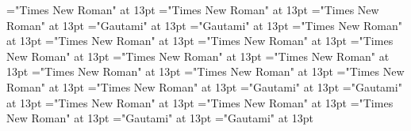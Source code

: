 \documentclass[a4paper]{article}
\begin{document}
\font\CmPossibilitypublishStemTransTypeNamePubenspanspanspansensespanentryletDatadicBody="Times New Roman" at 13pt
\font\spanenCmPossibilitypublishStemTransTypeNamePubenspanspanspansensespanentryletDatadicBody="Times New Roman" at 13pt
\font\spanenspanspanspansensespanentryletDatadicBody="Times New Roman" at 13pt
\font\translationLdtespanspansensespanentryletDatadicBody="Gautami" at 13pt
\font\spantetranslationLdtespanspansensespanentryletDatadicBody="Gautami" at 13pt
\font\spanentranslationLdtespanspansensespanentryletDatadicBody="Times New Roman" at 13pt
\font\spanenspansensespanentryletDatadicBody="Times New Roman" at 13pt
\font\semanticdomainabbrenspansensespanentryletDatadicBody="Times New Roman" at 13pt
\font\spanensemanticdomainabbrenspansensespanentryletDatadicBody="Times New Roman" at 13pt
\font\semanticdomainnameenspansensespanentryletDatadicBody="Times New Roman" at 13pt
\font\spanensemanticdomainnameenspansensespanentryletDatadicBody="Times New Roman" at 13pt
\font{}="Times New Roman" at 13pt
\font\xitemendefinitionLdensensespanentryletDatadicBody="Times New Roman" at 13pt
\font\spanenxitemendefinitionLdensensespanentryletDatadicBody="Times New Roman" at 13pt
\font\spanendefinitionLdensensespanentryletDatadicBody="Times New Roman" at 13pt
\font\xitemtedefinitionLdensensespanentryletDatadicBody="Gautami" at 13pt
\font\spantexitemtedefinitionLdensensespanentryletDatadicBody="Gautami" at 13pt
\font\LexSensepublishStemGlossPubLdensensespanentryletDatadicBody="Times New Roman" at 13pt
\font\xitemenLexSensepublishStemGlossPubLdensensespanentryletDatadicBody="Times New Roman" at 13pt
\font\spanenxitemenLexSensepublishStemGlossPubLdensensespanentryletDatadicBody="Times New Roman" at 13pt
\font\xitemteLexSensepublishStemGlossPubLdensensespanentryletDatadicBody="Gautami" at 13pt
\font\spantexitemteLexSensepublishStemGlossPubLdensensespanentryletDatadicBody="Gautami" at 13pt
\end{document}
